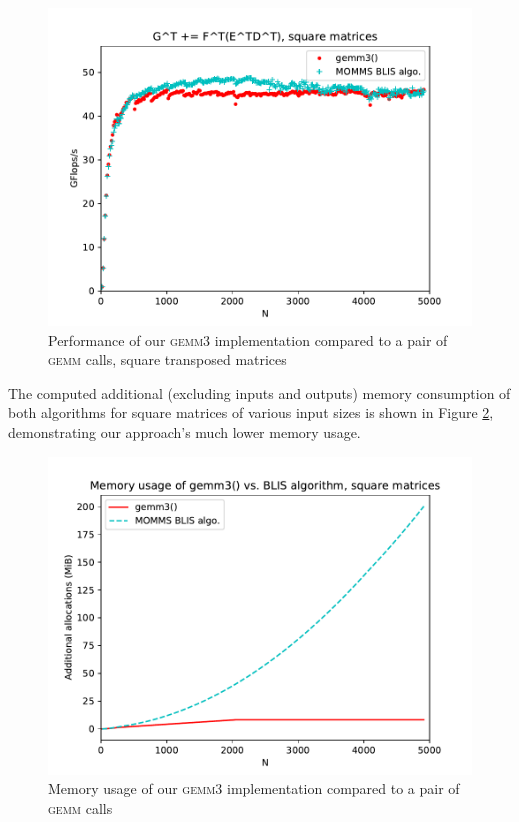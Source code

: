 \documentclass[12pt]{article}
\newcommand*{\gemmt}{{\textsc{gemm3}}}
\newcommand*{\gemm}{{\textsc{gemm}}}
\begin{document}
\begin{figure}
  \centering
  \includegraphics[height=0.40\textheight]{../results/earwig2/gemm3_ab_bc_kernel}
  \caption{Performance of our \gemmt{} implementation compared to a pair of \gemm{} calls, square transposed matrices}
  \label{fig:ab_square}
\end{figure}

The computed additional (excluding inputs and outputs) memory consumption of both algorithms for square matrices of various input sizes is shown in Figure \ref{fig:bc_square_mem}, demonstrating our approach's much lower memory usage.
\begin{figure}
  \centering
  \includegraphics[height=0.40\textheight]{../results/earwig2/gemm3_memory}
  \caption{Memory usage of our \gemmt{} implementation compared to a pair of \gemm{} calls}
  \label{fig:bc_square_mem}
\end{figure}
\end{document}
